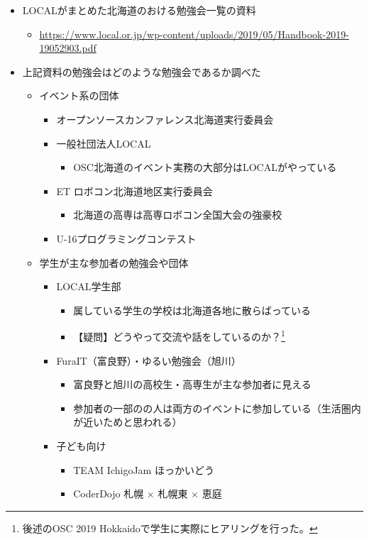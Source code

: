 \documentclass[mingoth,a4paper]{jsarticle}
\begin{document}
\begin{itemize}
\item  LOCALがまとめた北海道のおける勉強会一覧の資料
  \begin{itemize}
  \item \url{https://www.local.or.jp/wp-content/uploads/2019/05/Handbook-2019-19052903.pdf}
  \end{itemize}
\item 上記資料の勉強会はどのような勉強会であるか調べた
  \begin{itemize}
  \item イベント系の団体
    \begin{itemize}
    \item オープンソースカンファレンス北海道実行委員会
    \item 一般社団法人LOCAL
      \begin{itemize}
      \item OSC北海道のイベント実務の大部分はLOCALがやっている
      \end{itemize}
    \item ET ロボコン北海道地区実行委員会
      \begin{itemize}
      \item 北海道の高専は高専ロボコン全国大会の強豪校
      \end{itemize}
    \item U-16プログラミングコンテスト
    \end{itemize}
  \item 学生が主な参加者の勉強会や団体
    \begin{itemize}
    \item LOCAL学生部
      \begin{itemize}
      \item 属している学生の学校は北海道各地に散らばっている
      \item 【疑問】どうやって交流や話をしているのか？\footnote{後述のOSC 2019 Hokkaidoで学生に実際にヒアリングを行った。}
      \end{itemize}
    \item FuraIT（富良野）・ゆるい勉強会（旭川）
      \begin{itemize}
      \item 富良野と旭川の高校生・高専生が主な参加者に見える
      \item 参加者の一部のの人は両方のイベントに参加している（生活圏内が近いためと思われる）
      \end{itemize}
    \item 子ども向け
      \begin{itemize}
      \item TEAM IchigoJam ほっかいどう
      \item CoderDojo 札幌 × 札幌東 × 恵庭
      \end{itemize}
    \end{itemize}
  \end{itemize}
\end{itemize}
\end{document}
